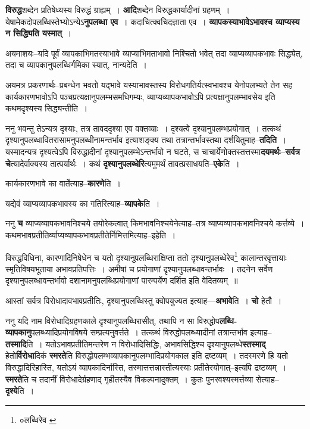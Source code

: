 \documentclass[article,12pt,a4paper]{memoir}
\begin{document}
	  \pstart \textbf{विरुद्ध}शब्देन प्रतिषेध्यस्य विरुद्धं ग्राह्यम् । \textbf{आदि}शब्देन विरुद्धकार्यादीनां ग्रहणम् । येषामेकदोपलब्धिस्तेभ्योऽन्येऽ\textbf{नुपलब्धा एव} । कदाचित्क्वचिदज्ञाता एव । \textbf{व्यापकस्याभावेऽभावश्च व्याप्यस्य न सिद्ध्यिति यस्मात्} ।
	\pend
      

	  \pstart अयमाशयः--यदि पूर्वं व्यापकाभिमतस्याभावे व्याप्याभिमताभावो निश्चितो भवेत् तदा व्याप्यव्यापकभावः सिद्ध्येत्, तदा च व्यापकानुपलब्धिर्गमिका स्यात्, नान्यदेति ।
	\pend
      

	  \pstart अयमत्र प्रकरणार्थः--प्रबन्धेन भवतो यद्भावे यस्याभावस्तस्य विरोधगतिर्यत्स्वभावश्च येनोपलभ्यते तेन सह कार्यकारणभावोऽपि पञ्चप्रत्यक्षानुपलम्भसमधिगम्यः, व्याप्यव्यापकभावोऽपि प्रत्यक्षानुपलम्भावसेय इति कथमदृश्यस्य सिद्ध्यन्तीति ।
	\pend
      

	  \pstart ननु भवन्तु तेऽन्यत्र दृश्याः, तत्र तावददृश्या एव वक्तव्याः । दृश्यत्वे दृश्यानुपलम्भप्रयोगात् । तत्कथं दृश्यानुपलब्धावितरासामनुपलब्धीनामन्तर्भाव इत्याशङ्क्य तथा तत्रान्तर्भावस्तथा दर्शयितुमाह--\textbf{तदिति} । यस्मादन्यत्र दृश्यत्वेऽपि विरुद्धादीनां दृश्यानुपलम्भेऽन्तर्भावो न घटते, स चाचार्येणोक्तस्तत्तस्मा\textbf{दयमर्थः--सर्वत्र चे}त्यादेर्वाक्यस्य तात्पर्यार्थः । कथं \textbf{दृश्यानुपलब्धेरि}त्यमुमर्थं तावत्प्रसाधयति--\textbf{एके}ति ।
	\pend
      

	  \pstart कार्यकारणभावे का वार्तेत्याह--\textbf{कारणे}ति ।
	\pend
      

	  \pstart यद्येवं व्याप्यव्यापकभावस्य का गतिरित्याह--\textbf{व्यापके}ति ।
	\pend
      

	  \pstart ननु \textbf{च} व्याप्यव्यापकभावनिश्चये तयोरेकत्वात् किमभावनिश्चयेनेत्याह--तत्र व्याप्यव्यापकभावनिश्चये कर्त्त\leavevmode{}व्ये । कथमभावप्रतीतिर्व्याप्यव्यापकभावप्रतीतेर्निमित्तमित्याह--इहेति ।
	\pend
	  \bigskip
	  \begingroup
	

	  \pstart विरुद्धविधिना, कारणादिनिषेधेन च यतो दृश्यानुपलब्धिराक्षिप्ता ततो दृश्यानुपलब्धेरेव\footnote{०लब्धिरेव \cite{dp-msC}} कालान्तरवृत्तायाः स्मृतिविषयभूताया अभावप्रतिपत्तिः । अमीषां च प्रयोगाणां दृश्यानुपलब्धावन्तर्भावः । तदनेन सर्वेण दृश्यानुपलब्धावन्तर्भावो दशानामनुपलब्धिप्रयोगाणां पारम्पर्येण दर्शित इति वेदितव्यम् ॥
	\pend
      
	  \endgroup
	

	  \pstart आस्तां सर्वत्र विरोधादावभावप्रतीतिः, दृश्यानुपलब्धिस्तु क्वोपयुज्यत इत्याह—\textbf{अभावे}ति । \textbf{चो} हेतौ ।
	\pend
      

	  \pstart ननु यदि नाम विरोधादिग्रहणकाले दृश्यानुपलब्धिरासीत्, तथापि न सा विरुद्धोप\textbf{लब्धि-व्यापकानु}पलब्ध्यादिप्रयोगविषये सम्प्रत्यनुवर्त्तते । तत्कथं विरुद्धोपलब्ध्यादीनां तत्रान्तर्भाव इत्याह--\textbf{तस्मादि}ति । यतोऽभावप्रतीतिमन्तरेण न विरोधादिसिद्धिः, अभावसिद्धिश्च दृश्यानुपलब्धे\textbf{स्तस्माद्} हेतो\textbf{र्विरोधा}दिकं \textbf{स्मरते}ति विरुद्धोपलम्भव्यापकानुपलम्भादिप्रयोगकाल इति द्रष्टव्यम् । तदस्मरणे हि यतो विरुद्धादिरिहास्ति, यतोऽयं व्यापकादिर्नास्ति, तस्मात्तत्तन्नास्तीत्यस्याः प्रतीतेरयोगात्--इत्यपि द्रष्टव्यम् । \textbf{स्मरते}ति च तदानीं विरोधादेर्ग्रहणाद् गृहीतस्यैव विकल्पनादुक्तम् । कुतः पुनरवश्यस्मर्त्तव्या सेत्याह--\textbf{दृश्ये}ति ।
	\pend
      
\end{document}
